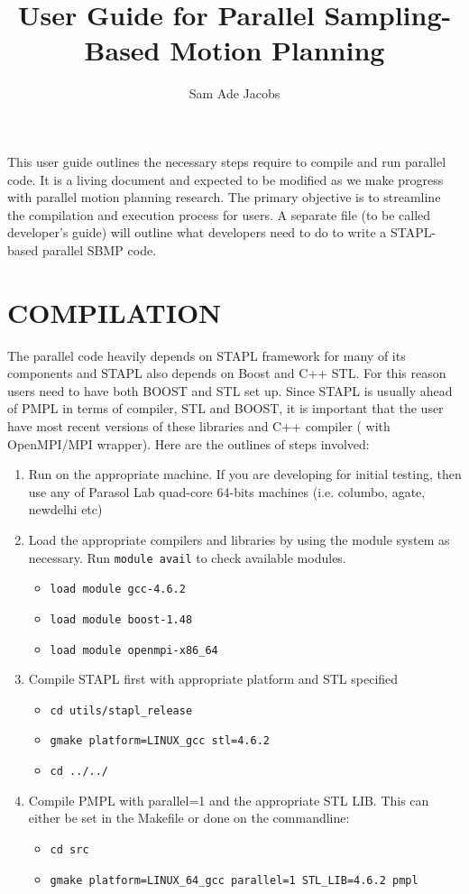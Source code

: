 \documentclass[12pt]{article}
\title{\Large \bf User Guide for Parallel Sampling-Based Motion Planning}
\author{Sam Ade Jacobs}
\begin{document}
\maketitle

This user guide outlines the necessary steps require to compile and run parallel code.
It is a living document and expected to be modified as we make progress with parallel motion planning
research. The primary objective is to streamline the compilation and execution process for users.
A separate file (to be called developer's guide) will outline what developers need to do to write a
STAPL-based parallel SBMP code.



\section{COMPILATION}
The parallel code heavily depends on STAPL framework for many of its components and STAPL also depends on
Boost and C++ STL. For this reason users need to have both BOOST and STL set up. Since STAPL is usually
ahead of PMPL in terms of compiler, STL and BOOST, it is important that the user have most recent versions of
these libraries and C++ compiler ( with OpenMPI/MPI wrapper). Here are the outlines of steps involved:
\begin{enumerate}
\item Run on the appropriate machine.  If you are developing for initial testing, then use any of Parasol Lab quad-core 64-bits machines (i.e. columbo, agate, newdelhi etc)
\item Load the appropriate compilers and libraries by using the module system as necessary.  Run {\tt module avail} to check available modules.
  \begin{itemize}
    \item {\tt load module gcc-4.6.2}
    \item {\tt load module boost-1.48}
    \item {\tt load module openmpi-x86\_64}
  \end{itemize}
\item Compile STAPL first with appropriate platform and STL specified
  \begin{itemize}
    \item {\tt cd utils/stapl\_release}
    \item {\tt gmake platform=LINUX\_gcc stl=4.6.2}
    \item {\tt cd ../../}
  \end{itemize}
\item Compile PMPL with parallel=1 and the appropriate STL LIB. This can either be set in the Makefile or done on the commandline:
  \begin{itemize}
    \item {\tt cd src}
    \item {\tt gmake platform=LINUX\_64\_gcc parallel=1 STL\_LIB=4.6.2 pmpl}
  \end{itemize}
\end{enumerate}
\end{document}
